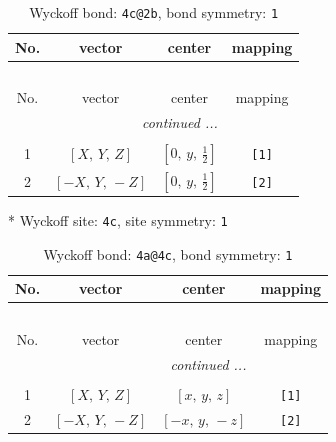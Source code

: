 \documentclass[fleqn,8pt]{jsarticle}
\begin{document}
\renewcommand{\arraystretch}{1.2}
\begin{longtable}{cccc}
\caption{Wyckoff bond: {\tt 4c@2b}, bond symmetry: {\tt 1}}
 \\
 \hline \hline
No. & vector & center & mapping \\ \hline \endfirsthead

\multicolumn{3}{l}{\tablename\ \thetable{}} \\
 \hline \hline
No. & vector & center & mapping \\ \hline \endhead

 \hline \hline
\multicolumn{3}{r}{\footnotesize\it continued ...} \\ \endfoot

 \hline \hline
\multicolumn{3}{r}{} \\ \endlastfoot

1 & $\left[ X,\, Y,\, Z \right]$ & $\left[ 0,\, y,\, \frac{1}{2} \right]$ & {\tt [1]} \\ \hline
2 & $\left[ - X,\, Y,\, - Z \right]$ & $\left[ 0,\, y,\, \frac{1}{2} \right]$ & {\tt [2]} \\
\end{longtable}
* Wyckoff site: {\tt 4c}, site symmetry: {\tt 1}
\renewcommand{\arraystretch}{1.2}
\begin{longtable}{cccc}
\caption{Wyckoff bond: {\tt 4a@4c}, bond symmetry: {\tt 1}}
 \\
 \hline \hline
No. & vector & center & mapping \\ \hline \endfirsthead

\multicolumn{3}{l}{\tablename\ \thetable{}} \\
 \hline \hline
No. & vector & center & mapping \\ \hline \endhead

 \hline \hline
\multicolumn{3}{r}{\footnotesize\it continued ...} \\ \endfoot

 \hline \hline
\multicolumn{3}{r}{} \\ \endlastfoot

1 & $\left[ X,\, Y,\, Z \right]$ & $\left[ x,\, y,\, z \right]$ & {\tt [1]} \\ \hline
2 & $\left[ - X,\, Y,\, - Z \right]$ & $\left[ - x,\, y,\, - z \right]$ & {\tt [2]} \\
\end{longtable}
\end{document}
